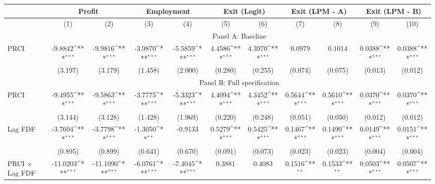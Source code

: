 {
\def\sym#1{\ifmmode^{#1}\else\(^{#1}\)\fi}
\begin{tabular}{l*{10}{c}}
\hline
            &\multicolumn{2}{c}{Profit}&\multicolumn{2}{c}{Employment}&\multicolumn{2}{c}{Exit (Logit)}&\multicolumn{2}{c}{Exit (LPM - A)}&\multicolumn{2}{c}{Exit (LPM - B)}\\\hline
    &     (1) &     (2)    &     (3)&     (4)&      (5)&      (6)&      (7)&      (8)&      (9)&      (10)\\\hline
& \multicolumn{10}{c}{Panel A: Baseline} \\ \hline
PRCI        &     -9.8842\sym{***}&     -9.9816\sym{***}&     -3.9870\sym{***}&     -5.5859\sym{***}&      4.4586\sym{***}&      4.3970\sym{***}&      0.0979         &      0.1014         &      0.0388\sym{***}&      0.0388\sym{***}\\
            &     (3.197)         &     (3.179)         &     (1.458)         &     (2.000)         &     (0.280)         &     (0.255)         &     (0.074)         &     (0.075)         &     (0.013)         &     (0.012)         \\
\hline\hline
& \multicolumn{10}{c}{Panel B: Full specification}\\\hline
PRCI        &     -9.4955\sym{***}&     -9.5863\sym{***}&     -3.7775\sym{***}&     -5.3323\sym{***}&      4.4094\sym{***}&      4.3452\sym{***}&      0.5644\sym{***}&      0.5610\sym{***}&      0.0370\sym{***}&      0.0370\sym{***}\\
            &     (3.144)         &     (3.128)         &     (1.428)         &     (1.969)         &     (0.220)         &     (0.248)         &     (0.051)         &     (0.050)         &     (0.012)         &     (0.012)         \\
[1em]
Lag FDF       &     -3.7604\sym{***}&     -3.7798\sym{***}&     -1.3050\sym{**} &     -0.9133         &      0.5279\sym{***}&      0.5425\sym{***}&      0.1467\sym{***}&      0.1490\sym{***}&      0.0149\sym{***}&      0.0151\sym{***}\\
            &     (0.895)         &     (0.899)         &     (0.641)         &     (0.670)         &     (0.091)         &     (0.073)         &     (0.023)         &     (0.023)         &     (0.004)         &     (0.004)         \\
[1em]
PRCI $ \times $ Lag FDF&    -11.0203\sym{***}&    -11.1090\sym{***}&     -6.0761\sym{***}&     -7.4045\sym{***}&      0.3881         &      0.4083         &      0.1516\sym{**} &      0.1533\sym{**} &      0.0503\sym{***}&      0.0507\sym{***}\\

\end{tabular}}
